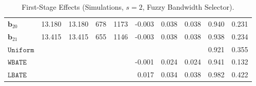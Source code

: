 \documentclass[10pt]{article}
\newcommand{\bb}{\mathbf{b}}
\begin{document}
\begin{table}[p]
\begin{tabular}{lccccrrrrr}
$\bb_{20}$ & 13.180 & 13.180 & 678 & 1173 & -0.003 & 0.038 & 0.038 & 0.940 & 0.231 \\
$\bb_{21}$ & 13.415 & 13.415 & 655 & 1146 & -0.003 & 0.038 & 0.038 & 0.938 & 0.234 \\
\midrule
$\mathtt{Uniform}$ &  &  &  &  &  &  &  & 0.921 & 0.355 \\
\midrule
$\mathtt{WBATE}$ &  &  &  &  & -0.001 & 0.024 & 0.024 & 0.941 & 0.132 \\
\midrule
$\mathtt{LBATE}$ &  &  &  &  & 0.017 & 0.034 & 0.038 & 0.982 & 0.422 \\
\bottomrule\bottomrule
\end{tabular}

    \caption{First-Stage Effects (Simulations, $s=2$, Fuzzy Bandwidth Selector).}
    \label{tab:sa-simuls-fs-s2-bwmain}
\end{table}
\end{document}
